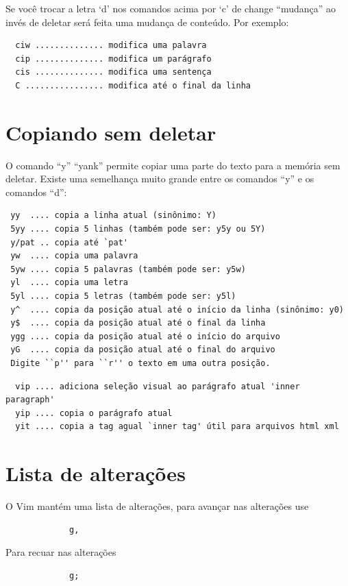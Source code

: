 \documentclass[10pt,a4paper,openany]{book}
\begin{document}
Se você trocar a letra `d' nos comandos acima por `c' de change
``mudança'' ao invés de deletar será feita uma mudança de conteúdo.
Por exemplo:

\begin{verbatim}
  ciw .............. modifica uma palavra
  cip .............. modifica um parágrafo
  cis .............. modifica uma sentença
  C ................ modifica até o final da linha
\end{verbatim}

\section{Copiando sem deletar}\label{Copiando sem deletar}

O comando ``y'' ``yank'' permite copiar uma parte do texto para a memória sem deletar.
Existe uma semelhança muito grande entre os comandos ``y'' e os comandos ``d'':

\begin{verbatim}
 yy  .... copia a linha atual (sinônimo: Y)
 5yy .... copia 5 linhas (também pode ser: y5y ou 5Y)
 y/pat .. copia até `pat'
 yw  .... copia uma palavra
 5yw .... copia 5 palavras (também pode ser: y5w)
 yl  .... copia uma letra
 5yl .... copia 5 letras (também pode ser: y5l)
 y^  .... copia da posição atual até o início da linha (sinônimo: y0)
 y$  .... copia da posição atual até o final da linha
 ygg .... copia da posição atual até o início do arquivo
 yG  .... copia da posição atual até o final do arquivo
 Digite ``p'' para ``r'' o texto em uma outra posição.
\end{verbatim}

\begin{verbatim}
  vip .... adiciona seleção visual ao parágrafo atual 'inner paragraph'
  yip .... copia o parágrafo atual
  yit .... copia a tag agual `inner tag' útil para arquivos html xml
\end{verbatim}

\section{Lista de alterações}
O Vim mantém uma lista de alterações, para avançar nas alterações use

\begin{verbatim}
			 g,
\end{verbatim}

Para recuar nas alterações

\begin{verbatim}
			 g;
\end{verbatim}
\end{document}
